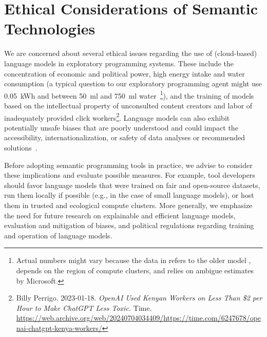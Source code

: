 
\section{Ethical Considerations of Semantic Technologies}
\label{sec:discussion/ethics}

We are concerned about several ethical issues regarding the use of (cloud-based) language models in exploratory programming systems.
These include the concentration of economic and political power, high energy intake and water consumption (a typical question to our exploratory programming agent might use \qty{0.05}{kWh} and between \qty{50}{ml} and \qty{750}{ml} water~\cite{li2023making}\footnote{%
	Actual numbers might vary because the data in \cite{li2023making} refers to the older model \gptthree, depends on the region of compute clusters, and relies on ambigue estimates by Microsoft.
}), and the training of models based on the intellectual property of unconsulted content creators and labor of inadequately provided click workers\footnote{%
	Billy Perrigo.
	2023-01-18.
	\emph{OpenAI Used Kenyan Workers on Less Than \$2 per Hour to Make ChatGPT Less Toxic.}
	Time.
	\url{https://web.archive.org/web/20240704034409/https://time.com/6247678/openai-chatgpt-kenya-workers/}%
}.
Language models can also exhibit potentially unsafe biases that are poorly understood and could impact the accessibility, internationalization, or safety of data analyses or recommended solutions~\cite{openai2024gpt4}.

Before adopting semantic programming tools in practice, we advise to consider these implications and evaluate possible measures.
For example, tool developers should favor language models that were trained on fair and open-source datasets, run them locally if possible (e.g., in the case of small language models), or host them in trusted and ecological compute clusters.
More generally, we emphasize the need for future research on explainable and efficient language models, evaluation and mitigation of biases, and political regulations regarding training and operation of language models.
